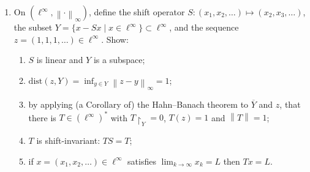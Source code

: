 \documentclass[11pt]{article}
\newcommand{\ellinfty}{\ell^{\infty}}
\newcommand{\norm}[1]{\left\lVert #1 \right\rVert}
\newcommand{\restr}[2]{#1\!\upharpoonright_{#2}}
\begin{document}
\begin{enumerate}[label=\arabic*., leftmargin=*, itemsep=10pt]
\item On $(\ellinfty,\norm{\cdot}_\infty)$, define the shift operator $S:(x_1,x_2,\dots)\mapsto (x_2,x_3,\dots)$, the subset
$Y=\{x-Sx\mid x\in \ellinfty\}\subset \ellinfty$, and the sequence $z=(1,1,1,\dots)\in \ellinfty$. Show:
\begin{enumerate}[label=(\alph*), itemsep=4pt]
\item $S$ is linear and $Y$ is a subspace;
\item $\mathrm{dist}(z,Y)=\inf_{y\in Y}\norm{z-y}_\infty=1$;
\item by applying (a Corollary of) the Hahn--Banach theorem to $\overline{Y}$ and $z$, that there
is $T\in (\ellinfty)^*$ with $\restr{T}{Y}=0$, $T(z)=1$ and $\norm{T}=1$;
\item $T$ is shift-invariant: $TS=T$;
\item if $x=(x_1,x_2,\dots)\in \ellinfty$ satisfies $\lim_{k\to\infty} x_k=L$ then $Tx=L$.
\end{enumerate}


\end{enumerate}
\end{document}
